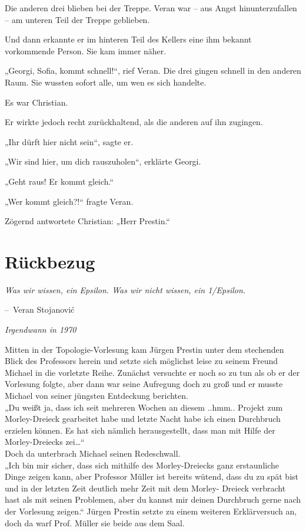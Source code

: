 \documentclass[oneside]{memoir}
\makeatletter
\newenvironment{chapquote}[2][2em]
  {\setlength{\@tempdima}{#1}%
   \def\chapquote@author{#2}%
   \parshape 1 \@tempdima \dimexpr\textwidth-2\@tempdima\relax%
   \itshape}
  {\par\normalfont\hfill--\ \chapquote@author\hspace*{\@tempdima}\par\bigskip}
\makeatother
\begin{document}
Die anderen drei blieben bei der Treppe. Veran war -- aus Angst hinunterzufallen -- am unteren Teil der Treppe geblieben.

Und dann erkannte er im hinteren Teil des Kellers eine ihm bekannt vorkommende Person. Sie kam immer näher.

„Georgi, Sofia, kommt schnell!“, rief Veran. Die drei gingen schnell in den anderen Raum. Sie wussten sofort alle, um wen es sich handelte.

Es war Christian.

Er wirkte jedoch recht zurückhaltend, als die anderen auf ihn zugingen.

„Ihr dürft hier nicht sein“, sagte er.

„Wir sind hier, um dich rauszuholen“, erklärte Georgi.

„Geht raus! Er kommt gleich.“

„Wer kommt gleich?!“ fragte Veran.

Zögernd antwortete Christian: „Herr Prestin.“

\chapter{Rückbezug} %
\begin{chapquote}{Veran Stojanović}
\glqq Was wir wissen, ein Epsilon. Was wir nicht wissen, ein 1/Epsilon.\grqq
\end{chapquote}

\textit{Irgendwann in 1970}

Mitten in der Topologie-Vorlesung kam Jürgen Prestin unter dem stechenden Blick des Professors herein und setzte sich möglichst leise zu seinem Freund Michael in die vorletzte Reihe. Zunächst versuchte er noch so zu tun als ob er der Vorlesung folgte, aber dann war seine Aufregung doch zu groß und er musste Michael von seiner jüngsten Entdeckung berichten. \\
 „Du weißt ja, dass ich seit mehreren Wochen an diesem ..hmm.. Projekt zum Morley-Dreieck gearbeitet habe und letzte Nacht habe ich einen Durchbruch erzielen können. Es hat sich nämlich herausgestellt, dass man mit Hilfe der Morley-Dreiecks zei\ldots“  \\
Doch da unterbrach Michael seinen Redeschwall. \\
„Ich bin mir sicher, dass sich mithilfe des Morley-Dreiecks ganz erstaunliche Dinge zeigen kann, aber Professor Müller ist bereits wütend, dass du zu spät bist und in der letzten Zeit deutlich mehr Zeit mit dem Morley- Dreieck verbracht hast als mit seinen Problemen, aber du kannst mir deinen Durchbruch gerne nach der Vorlesung zeigen.“ Jürgen Prestin setzte zu einem weiteren Erklärversuch an, doch da warf Prof. Müller sie beide aus dem Saal.
 
\end{document}
